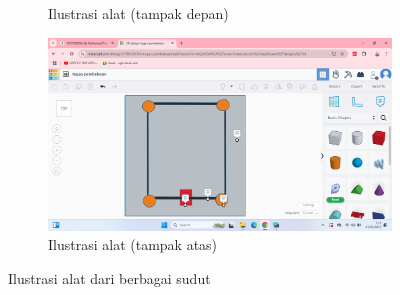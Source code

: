 \begin{figure}[!htbp]
\begin{subfigure}[b]{0.45\linewidth}
        \caption{Ilustrasi alat (tampak depan)}
        \label{fig:ilustrasi-alat-depan}
    \end{subfigure}
    \hfill
    \begin{subfigure}[b]{0.45\linewidth}
        \centering
        \includegraphics[width=\linewidth]{images/Screenshot (5).png}
        \caption{Ilustrasi alat (tampak atas)}
        \label{fig:ilustrasi-alat-atas}
    \end{subfigure}
    \caption{Ilustrasi alat dari berbagai sudut}
    \label{fig:ilustrasi-alat-semua}
\end{figure}

\newpage


